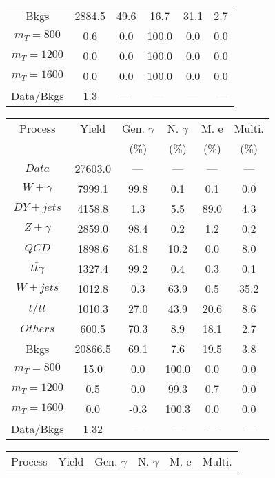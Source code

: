\begin{figure}
\begin{minipage}[c]{0.32\textwidth}
{\begin{tabular}{cccccc}
Bkgs &  2884.5 &  49.6 &  16.7 &  31.1 &  2.7\\
$ m_{T} = 800 $ &  0.6 &  0.0 &  100.0 &  0.0 &  0.0\\
$ m_{T} = 1200 $ &  0.0 &  0.0 &  100.0 &  0.0 &  0.0\\
$ m_{T} = 1600 $ &  0.0 &  0.0 &  100.0 &  0.0 &  0.0\\
Data/Bkgs &  1.3 &  --- &  --- &  --- &  ---\\
\hline
\end{tabular}
}
\end{minipage}
\begin{minipage}[c]{0.32\textwidth}
\centering
\tiny{
\begin{tabular}{cccccc}
\hline
Process & Yield & Gen. $\gamma$ & N. $\gamma$ & M. e & Multi. \\
 &  & (\%) & (\%) & (\%) & (\%)  \\
\hline
                                                                      $ Data $ &  27603.0 &  --- &  --- &  --- &  ---\\
$ W+\gamma $ &  7999.1 &  99.8 &  0.1 &  0.1 &  0.0\\
$ DY+jets $ &  4158.8 &  1.3 &  5.5 &  89.0 &  4.3\\
$ Z+\gamma $ &  2859.0 &  98.4 &  0.2 &  1.2 &  0.2\\
$ QCD $ &  1898.6 &  81.8 &  10.2 &  0.0 &  8.0\\
$ t\bar{t}\gamma $ &  1327.4 &  99.2 &  0.4 &  0.3 &  0.1\\
$ W+jets $ &  1012.8 &  0.3 &  63.9 &  0.5 &  35.2\\
$ t/t\bar{t} $ &  1010.3 &  27.0 &  43.9 &  20.6 &  8.6\\
$ Others $ &  600.5 &  70.3 &  8.9 &  18.1 &  2.7\\
Bkgs &  20866.5 &  69.1 &  7.6 &  19.5 &  3.8\\
$ m_{T} = 800 $ &  15.0 &  0.0 &  100.0 &  0.0 &  0.0\\
$ m_{T} = 1200 $ &  0.5 &  0.0 &  99.3 &  0.7 &  0.0\\
$ m_{T} = 1600 $ &  0.0 &  -0.3 &  100.3 &  0.0 &  0.0\\
Data/Bkgs &  1.32 &  --- &  --- &  --- &  ---\\
\hline
\end{tabular}
}
\end{minipage}
\begin{minipage}[c]{0.32\textwidth}
\centering
\tiny{
\begin{tabular}{cccccc}
\hline
Process & Yield & Gen. $\gamma$ & N. $\gamma$ & M. e & Multi. \\

\end{tabular}}
\end{minipage}
\end{figure}
